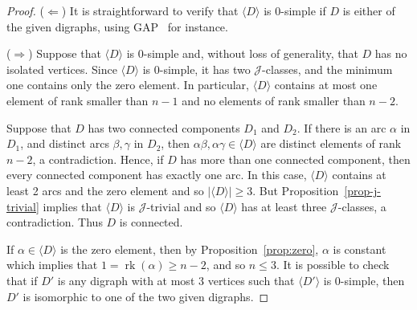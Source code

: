 \documentclass[ALCO,ThmDefs,Unicode,epreuves]{cedram}
\DeclareMathOperator{\Sing}{Sing}
\DeclareMathOperator{\rk}{rk}
\newcommand{\genset}[1]{\langle#1\rangle}
\newcommand{\J}{\mathcal{J}}
\begin{document}
\begin{proof}

 ($\Leftarrow$)
 It is straightforward to verify that $\genset{D}$ is 0-simple if $D$ is
 either of the given digraphs, using GAP~\cite{GAP4} for instance.

 ($\Rightarrow$) 
 Suppose that $\genset D$ is 0-simple and, without loss of generality, that
 $D$ has no isolated vertices. Since $\genset D$ is 0-simple, it has two
 $\J$-classes, and the minimum one contains only the zero element. In
 particular, $\genset D$ contains at most one element of rank smaller than $n
 -1$ and no elements of rank smaller than $n - 2$. 

 Suppose that $D$ has two connected components $D_1$ and $D_2$. If there is
 an arc $\alpha$ in $D_1$, and distinct arcs $\beta,\gamma$ in $D_2$, then
 $\alpha\beta,\alpha\gamma\in\genset D$ are distinct elements of rank $n-2$, a
 contradiction. Hence, if $D$ has more than one connected component, then
 every connected component has exactly one arc. In this case, $\genset{D}$
 contains at least 2 arcs and the zero element and so $|\genset{D}| \geq 3$. 
 But Proposition~\ref{prop-j-trivial} implies that $\genset D$ is $\J$-trivial
 and so $\genset{D}$ has at least three $\J$-classes, a contradiction. 
 Thus $D$ is connected. 

 If $\alpha\in \genset{D}$ is the zero element, then by
 Proposition~\ref{prop:zero}, $\alpha$ is constant which implies that $1 =
 \rk(\alpha) \geq n - 2$, and so $n \leq 3$. 
 It is possible to check that if $D'$ is any digraph with at most 3 vertices
 such that $\genset{D'}$ is 0-simple, then $D'$ is isomorphic to one of the
 two given digraphs. 
\end{proof}
\end{document}

